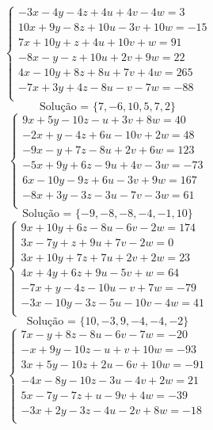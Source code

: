 \documentclass[12pt,oneside,a4paper]{article}
\begin{document}
\vspace{\baselineskip}
\begin{equation*}
\begin{cases}
-3x-4y-4z+4u+4v-4w=3 \\
10x+9y-8z+10u-3v+10w=-15 \\
7x+10y+z+4u+10v+w=91 \\
-8x-y-z+10u+2v+9w=22 \\
4x-10y+8z+8u+7v+4w=265 \\
-7x+3y+4z-8u-v-7w=-88 \\
\end{cases}
\end{equation*}
\begin{equation*}
\text{Solução = }\{7,-6,10,5,7,2\}
\end{equation*}
\vspace{\baselineskip}
\begin{equation*}
\begin{cases}
9x+5y-10z-u+3v+8w=40 \\
-2x+y-4z+6u-10v+2w=48 \\
-9x-y+7z-8u+2v+6w=123 \\
-5x+9y+6z-9u+4v-3w=-73 \\
6x-10y-9z+6u-3v+9w=167 \\
-8x+3y-3z-3u-7v-3w=61 \\
\end{cases}
\end{equation*}
\begin{equation*}
\text{Solução = }\{-9,-8,-8,-4,-1,10\}
\end{equation*}
\vspace{\baselineskip}
\begin{equation*}
\begin{cases}
9x+10y+6z-8u-6v-2w=174 \\
3x-7y+z+9u+7v-2w=0 \\
3x+10y+7z+7u+2v+2w=23 \\
4x+4y+6z+9u-5v+w=64 \\
-7x+y-4z-10u-v+7w=-79 \\
-3x-10y-3z-5u-10v-4w=41 \\
\end{cases}
\end{equation*}
\begin{equation*}
\text{Solução = }\{10,-3,9,-4,-4,-2\}
\end{equation*}
\vspace{\baselineskip}
\begin{equation*}
\begin{cases}
7x-y+8z-8u-6v-7w=-20 \\
-x+9y-10z-u+v+10w=-93 \\
3x+5y-10z+2u-6v+10w=-91 \\
-4x-8y-10z-3u-4v+2w=21 \\
5x-7y-7z+u-9v+4w=-39 \\
-3x+2y-3z-4u-2v+8w=-18 \\
\end{cases}
\end{equation*}
\end{document}
